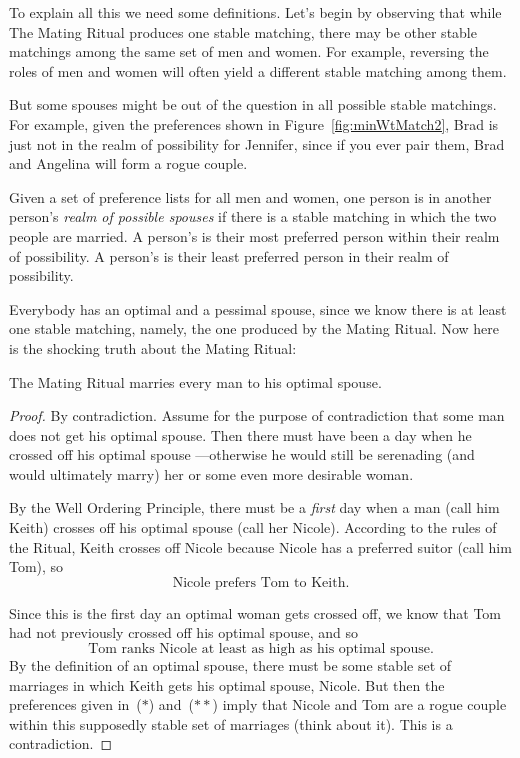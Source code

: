 To explain all this we need some definitions.  Let's begin by
observing that while The Mating Ritual produces one stable matching,
there may be other stable matchings among the same set of men and
women.  For example, reversing the roles of men and women will often
yield a different stable matching among them.

But some spouses might be out of the question in all possible stable
matchings.  For example, given the preferences shown in
Figure~\ref{fig:minWtMatch2}, Brad is just not in the realm of
possibility for Jennifer, since if you ever pair them, Brad and
Angelina will form a rogue couple.

\begin{definition}
Given a set of preference lists for all men and women, one person is
in another person's \emph{realm of possible spouses} if there is a
stable matching in which the two people are married.  A person's
 is their most preferred person within their
realm of possibility.  A person's  is their
least preferred person in their realm of possibility.
\end{definition}

Everybody has an optimal and a pessimal spouse, since we know there is at
least one stable matching, namely, the one produced by the Mating Ritual.
Now here is the shocking truth about the Mating Ritual:

\begin{theorem}\label{boyopt}
The Mating Ritual marries every man to his optimal spouse.
\end{theorem}

\begin{proof}
By contradiction.  Assume for the purpose of contradiction that some
man does not get his optimal spouse.  Then there must have been a day
when he crossed off his optimal spouse ---otherwise he would still be
serenading (and would ultimately marry) her or some even more
desirable woman.

By the Well Ordering Principle, there must be a \emph{first} day when
a man (call him Keith) crosses off his optimal spouse (call her
Nicole).
According to the rules of the Ritual, Keith crosses off Nicole because
Nicole has a preferred suitor (call him Tom), so
\begin{equation}
\text{Nicole prefers Tom to Keith.} \tag{$*$}
\end{equation}

Since this is the first day an optimal woman gets crossed off, we know
that Tom had not previously crossed off his optimal spouse, and so
\begin{equation}\tag{$**$}
\text{Tom ranks Nicole at least as high as his optimal spouse.}
\end{equation}
By the definition of an optimal spouse, there must be some stable set
of marriages in which Keith gets his optimal spouse, Nicole.  But then
the preferences given in~($*$) and~($**$) imply that Nicole and Tom
are a rogue couple within this supposedly stable set of marriages
(think about it).  This is a contradiction.
\end{proof}

